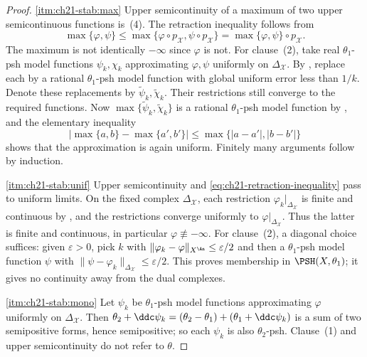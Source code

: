 \begin{proof}
\cref{itm:ch21-stab:max}  Upper semicontinuity of a maximum of two upper
semicontinuous functions is
\,(4).  The retraction inequality follows from
\[
 \max\{\varphi,\psi\}
 \leq\max\{\varphi\circ p_{\mathcal X},\psi\circ p_{\mathcal X}\}
 =\max\{\varphi,\psi\}\circ p_{\mathcal X}.
\]
The maximum is not identically \(-\infty\) since \(\varphi\) is not.  For
clause~(2), take real \(\theta_1\)-psh model functions
\(\psi_k,\chi_k\) approximating \(\varphi,\psi\) uniformly on
\(\Delta_{\mathcal X}\).  By
, replace each by a
rational \(\theta_1\)-psh model function with global uniform error less
than \(1/k\).  Denote these replacements by
\(\widetilde\psi_k,\widetilde\chi_k\).  Their restrictions still
converge to the required functions.  Now
\(\max\{\widetilde\psi_k,\widetilde\chi_k\}\) is a rational
\(\theta_1\)-psh model function by , and the
elementary inequality
\[
 \bigl|\max\{a,b\}-\max\{a',b'\}\bigr|
 \leq\max\{|a-a'|,|b-b'|\}
\]
shows that the approximation is again uniform.  Finitely many arguments
follow by induction.

\cref{itm:ch21-stab:unif}  Upper semicontinuity and
\eqref{eq:ch21-retraction-inequality} pass to uniform limits.  On the fixed
complex \(\Delta_{\mathcal X}\), each restriction
\(\varphi_k|_{\Delta_{\mathcal X}}\) is finite and continuous by
, and the restrictions converge uniformly
to \(\varphi|_{\Delta_{\mathcal X}}\).  Thus the latter is finite and
continuous, in particular \(\varphi\not\equiv-\infty\).  For clause~(2), a
diagonal choice suffices: given \(\varepsilon>0\), pick \(k\) with
\(\lVert\varphi_k-\varphi\rVert_{X^{\An}}\leq\varepsilon/2\) and then a
\(\theta_1\)-psh model function \(\psi\) with
\(\lVert\psi-\varphi_k\rVert_{\Delta_{\mathcal X}}\leq\varepsilon/2\).
This proves membership in \(\PSH(X,\theta_1)\); it gives no continuity away
from the dual complexes.

\cref{itm:ch21-stab:mono}  Let \(\psi_k\) be \(\theta_1\)-psh model functions
approximating \(\varphi\) uniformly on \(\Delta_{\mathcal X}\).  Then
\(\theta_2+\ddc\psi_k=(\theta_2-\theta_1)+(\theta_1+\ddc\psi_k)\) is a sum
of two semipositive forms, hence semipositive; so each \(\psi_k\) is also
\(\theta_2\)-psh.  Clause~(1) and upper semicontinuity do not refer to
\(\theta\).
\end{proof}

